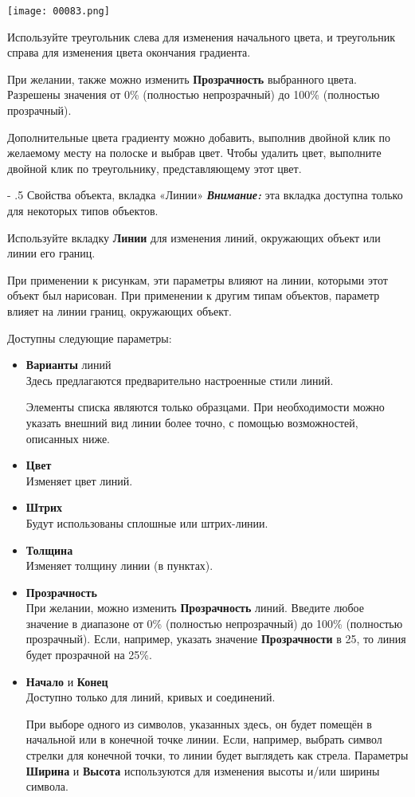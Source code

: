 ﻿\documentclass[a4paper,10pt]{article}
\makeatletter
\renewcommand\paragraph{%
   \@startsection{paragraph}{4}{0mm}%
      {-\baselineskip}%
      {.5\baselineskip}%
      {\normalfont\normalsize\bfseries}}
\makeatother
\begin{document}
\texttt{[image: 00083.png]}

Используйте треугольник слева для изменения начального цвета, и треугольник справа для изменения цвета окончания градиента.

При желании, также можно изменить \textbf{Прозрачность} выбранного цвета. Разрешены значения от 0\% (полностью непрозрачный) до 100\% (полностью прозрачный).

Дополнительные цвета градиенту можно добавить, выполнив двойной клик по желаемому месту на полоске и выбрав цвет. Чтобы удалить цвет, выполните двойной клик по треугольнику, представляющему этот цвет.

\paragraph{Свойства объекта, вкладка «Линии»} \label{sec:свойстваобъектавкллинии}
\textbf{\textit{Внимание:}} эта вкладка доступна только для некоторых типов объектов.

Используйте вкладку \textbf{Линии} для изменения линий, окружающих объект или линии его границ.

При применении к рисункам, эти параметры влияют на линии, которыми этот объект был нарисован. При применении к другим типам объектов, параметр влияет на линии границ, окружающих объект. 

Доступны следующие параметры:

\begin{itemize}
 \item \textbf{Варианты} линий\\
 Здесь предлагаются предварительно настроенные стили линий.
 
 Элементы списка являются только образцами. При необходимости можно указать внешний вид линии более точно, с помощью возможностей, описанных ниже.
 \item \textbf{Цвет}\\
 Изменяет цвет линий.
 \item \textbf{Штрих}\\
 Будут использованы сплошные или штрих-линии.
 \item \textbf{Толщина}\\
 Изменяет толщину линии (в пунктах).
 \item \textbf{Прозрачность}\\
 При желании, можно изменить \textbf{Прозрачность} линий. Введите любое значение в диапазоне от 0\% (полностью непрозрачный) до 100\% (полностью прозрачный). Если, например, указать значение \textbf{Прозрачности} в 25, то линия будет прозрачной на 25\%.
 \item \textbf{Начало} и \textbf{Конец}\\
 Доступно только для линий, кривых и соединений.
 
 При выборе одного из символов, указанных здесь, он будет помещён в начальной или в конечной точке линии. Если, например, выбрать символ стрелки для конечной точки, то линии будет выглядеть как стрела. Параметры \textbf{Ширина} и \textbf{Высота} используются для изменения высоты и/или ширины символа.
 \end{itemize}
 
\end{document}
